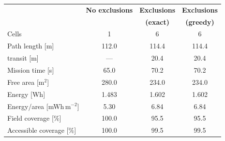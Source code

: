 \begin{tabular}{lccc}
\toprule
& \textbf{No exclusions} & \textbf{Exclusions} & \textbf{Exclusions} \\
& & \textbf{(exact)} & \textbf{(greedy)} \\
\midrule
Cells & 1 & 6 & 6 \\
Path length [m] & 112.0 & 114.4 & 114.4 \\
\quad transit [m] & --- & 20.4 & 20.4 \\
Mission time [s] & 65.0 & 70.2 & 70.2 \\
Free area [m$^2$] & 280.0 & 234.0 & 234.0 \\
Energy [Wh] & 1.483 & 1.602 & 1.602 \\
Energy/area [mWh\,m$^{-2}$] & 5.30 & 6.84 & 6.84 \\
Field coverage [\%] & 100.0 & 95.5 & 95.5 \\
Accessible coverage [\%] & 100.0 & 99.5 & 99.5 \\
\bottomrule
\end{tabular}
